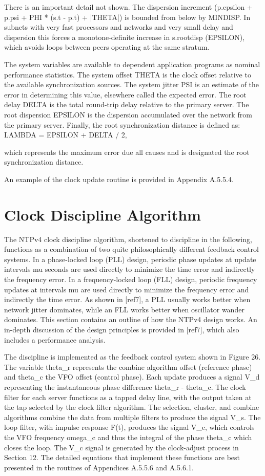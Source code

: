 There is an important detail not shown.  The dispersion increment
(p.epsilon + p.psi + PHI * (s.t - p.t) + |THETA|) is bounded from
below by MINDISP.  In subnets with very fast processors and networks
and very small delay and dispersion this forces a monotone-definite
increase in s.rootdisp (EPSILON), which avoids loops between peers
operating at the same stratum.

The system variables are available to dependent application programs
as nominal performance statistics.  The system offset THETA is the
clock offset relative to the available synchronization sources.  The
system jitter PSI is an estimate of the error in determining this
value, elsewhere called the expected error.  The root delay DELTA is
the total round-trip delay relative to the primary server.  The root
dispersion EPSILON is the dispersion accumulated over the network
from the primary server.  Finally, the root synchronization distance
is defined as:
LAMBDA = EPSILON + DELTA / 2,

which represents the maximum error due all causes and is designated
the root synchronization distance.

An example of the clock update routine is provided in
Appendix A.5.5.4.

\section{Clock Discipline Algorithm}

The NTPv4 clock discipline algorithm, shortened to discipline in the
following, functions as a combination of two quite philosophically
different feedback control systems.  In a phase-locked loop (PLL)
design, periodic phase updates at update intervals mu seconds are
used directly to minimize the time error and indirectly the frequency
error.  In a frequency-locked loop (FLL) design, periodic frequency
updates at intervals mu are used directly to minimize the frequency
error and indirectly the time error.  As shown in [ref7], a PLL
usually works better when network jitter dominates, while an FLL
works better when oscillator wander dominates.  This section contains
an outline of how the NTPv4 design works.  An in-depth discussion of
the design principles is provided in [ref7], which also includes a
performance analysis.

The discipline is implemented as the feedback control system shown in
Figure 26.  The variable theta\_r represents the combine algorithm
offset (reference phase) and theta\_c the VFO offset (control phase).
Each update produces a signal V\_d representing the instantaneous
phase difference theta\_r - theta\_c.  The clock filter for each server
functions as a tapped delay line, with the output taken at the tap
selected by the clock filter algorithm.  The selection, cluster, and
combine algorithms combine the data from multiple filters to produce
the signal V\_s.  The loop filter, with impulse response F(t),
produces the signal V\_c, which controls the VFO frequency omega\_c and
thus the integral of the phase theta\_c which closes the loop.  The
V\_c signal is generated by the clock-adjust process in Section 12.
The detailed equations that implement these functions are best
presented in the routines of Appendices A.5.5.6 and A.5.6.1.

